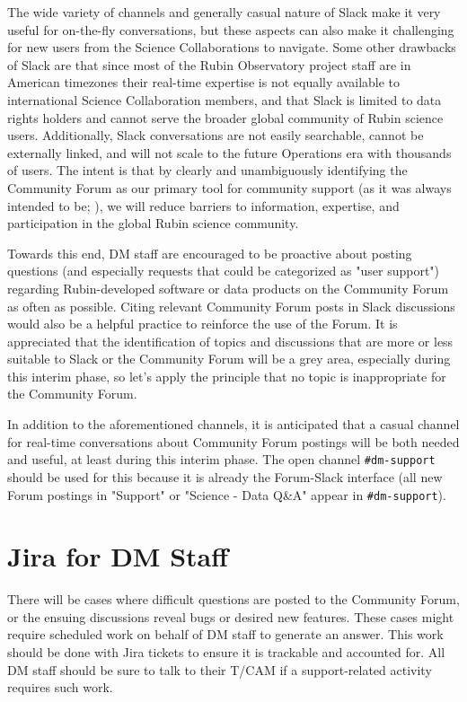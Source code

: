 \documentclass[DM,lsstdraft,authoryear,toc]{lsstdoc}
\begin{document}
The wide variety of channels and generally casual nature of Slack make it very useful for on-the-fly conversations, but these aspects can also make it challenging for new users from the Science Collaborations to navigate.
Some other drawbacks of Slack are that since most of the Rubin Observatory project staff are in American timezones their real-time expertise is not equally available to international Science Collaboration members, and that Slack is limited to data rights holders and cannot serve the broader global community of Rubin science users.
Additionally, Slack conversations are not easily searchable, cannot be externally linked, and will not scale to the future Operations era with thousands of users.
The intent is that by clearly and unambiguously identifying the Community Forum as our primary tool for community support (as it was always intended to be; ), we will reduce barriers to information, expertise, and participation in the global Rubin science community.

Towards this end, DM staff are encouraged to be proactive about posting questions (and especially requests that could be categorized as "user support") regarding Rubin-developed software or data products on the Community Forum as often as possible.
Citing relevant Community Forum posts in Slack discussions would also be a helpful practice to reinforce the use of the Forum.
It is appreciated that the identification of topics and discussions that are more or less suitable to Slack or the Community Forum will be a grey area, especially during this interim phase, so let's apply the principle that no topic is inappropriate for the Community Forum.

In addition to the aforementioned channels, it is anticipated that a casual channel for real-time conversations about Community Forum postings will be both needed and useful, at least during this interim phase.
The open channel {\tt \#dm-support} should be used for this because it is already the Forum-Slack interface (all new Forum postings in "Support" or "Science - Data Q\&A" appear in {\tt \#dm-support}).

\section{Jira for DM Staff}\label{sec:jira}

There will be cases where difficult questions are posted to the Community Forum, or the ensuing discussions reveal bugs or desired new features.
These cases might require scheduled work on behalf of DM staff to generate an answer.
This work should be done with Jira tickets to ensure it is trackable and accounted for.
All DM staff should be sure to talk to their T/CAM if a support-related activity requires such work.
\end{document}
